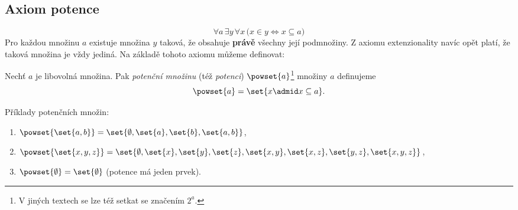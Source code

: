\subsection{Axiom potence}
\begin{equation*}
    \forall a\,\exists y\,\forall x\,\big(x\in y \iff x\subseteq a\big)
\end{equation*}
Pro každou množinu $a$ existuje množina $y$ taková, že obsahuje \textbf{právě} všechny její podmnožiny. Z axiomu extenzionality navíc opět platí, že taková množina je vždy jediná. Na základě tohoto axiomu můžeme definovat:
\begin{definition}
    Nechť $a$ je libovolná množina. Pak \emph{potenční množinu} (též \emph{potenci}) $\powset{a}$\footnote{V jiných textech se lze též setkat se značením $2^a$.} množiny $a$ definujeme
    \begin{equation*}
        \powset{a}=\set{x \admid x\subseteq a}.
    \end{equation*}
\end{definition}
\begin{example}\label{ex:potence}
    Příklady potenčních množin:
    \begin{enumerate}[label=(\roman*)]
        \item $\powset{\set{a,b}}=\set{\emptyset,\set{a},\set{b},\set{a,b}}$,
        \item $\powset{\set{x,y,z}}=\set{\emptyset,\set{x},\set{y},\set{z},\set{x,y},\set{x,z},\set{y,z},\set{x,y,z}}$,
        \item $\powset{\emptyset}=\set{\emptyset}$ (potence má jeden prvek).
    \end{enumerate}
\end{example}

